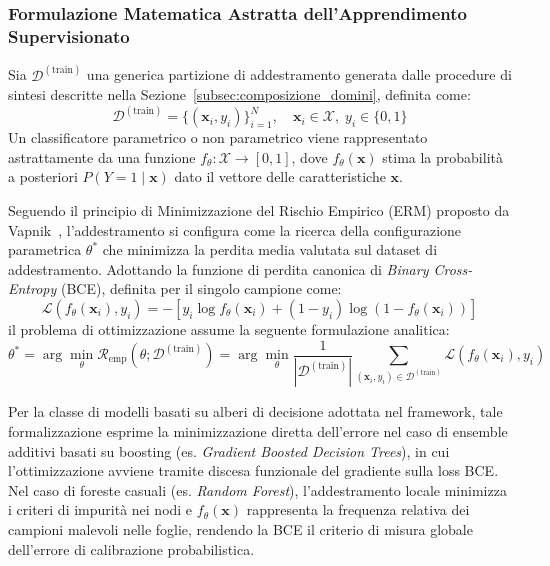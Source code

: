 \subsubsection{Formulazione Matematica Astratta dell'Apprendimento Supervisionato}
\label{subsubsec:formulazione_erm}
Sia $\mathcal{D}^{(\text{train})}$ una generica partizione di addestramento generata dalle procedure di sintesi descritte nella Sezione~\ref{subsec:composizione_domini}, definita come:
\begin{equation}
    \mathcal{D}^{(\text{train})} = \{(\mathbf{x}_i, y_i)\}_{i=1}^N, \quad \mathbf{x}_i \in \mathcal{X}, \; y_i \in \{0, 1\}
    \label{eq:train_partition_def}
\end{equation}
Un classificatore parametrico o non parametrico viene rappresentato astrattamente da una funzione $f_\theta: \mathcal{X} \rightarrow [0, 1]$, dove $f_\theta(\mathbf{x})$ stima la probabilità a posteriori $P(Y = 1 \mid \mathbf{x})$ dato il vettore delle caratteristiche $\mathbf{x}$.

Seguendo il principio di Minimizzazione del Rischio Empirico (ERM) proposto da Vapnik~\cite{vapnik1998}, l'addestramento si configura come la ricerca della configurazione parametrica $\theta^*$ che minimizza la perdita media valutata sul dataset di addestramento. Adottando la funzione di perdita canonica di \textit{Binary Cross-Entropy} (BCE), definita per il singolo campione come:
\begin{equation}
    \mathcal{L}\left(f_\theta(\mathbf{x}_i), y_i\right) = - \left[ y_i \log f_\theta(\mathbf{x}_i) + (1 - y_i) \log \left(1 - f_\theta(\mathbf{x}_i)\right) \right]
    \label{eq:bce_loss}
\end{equation}
il problema di ottimizzazione assume la seguente formulazione analitica:
\begin{equation}
    \theta^* = \arg\min_\theta \mathcal{R}_{\text{emp}}\left(\theta; \mathcal{D}^{(\text{train})}\right) = \arg\min_\theta \frac{1}{|\mathcal{D}^{(\text{train})}|} \sum_{(\mathbf{x}_i, y_i) \in \mathcal{D}^{(\text{train})}} \mathcal{L}\left(f_\theta(\mathbf{x}_i), y_i\right)
    \label{eq:erm_minimization}
\end{equation}

Per la classe di modelli basati su alberi di decisione adottata nel framework, tale formalizzazione esprime la minimizzazione diretta dell'errore nel caso di ensemble additivi basati su boosting (es. \textit{Gradient Boosted Decision Trees}), in cui l'ottimizzazione avviene tramite discesa funzionale del gradiente sulla loss BCE. Nel caso di foreste casuali (es. \textit{Random Forest}), l'addestramento locale minimizza i criteri di impurità nei nodi e $f_\theta(\mathbf{x})$ rappresenta la frequenza relativa dei campioni malevoli nelle foglie, rendendo la BCE il criterio di misura globale dell'errore di calibrazione probabilistica.

